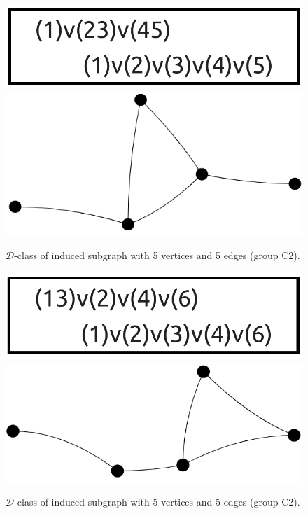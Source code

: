 \begin{appendices}
\begin{figure}[H]
\includegraphics[scale=0.12]{images/x1/x1_5v_5e_2.png}
\includegraphics[scale=0.1]{images/x1/x1_5v_5e_2_vis.png}
\caption{$\mathcal{D}$-class of induced subgraph with 5 vertices and 5 edges (group C2).}
\end{figure}

\begin{figure}[H]
\includegraphics[scale=0.12]{images/x1/x1_5v_5e.png}
\includegraphics[scale=0.1]{images/x1/x1_5v_5e_1_vis.png}
\caption{$\mathcal{D}$-class of induced subgraph with 5 vertices and 5 edges (group C2).}
\end{figure}


\end{appendices}
